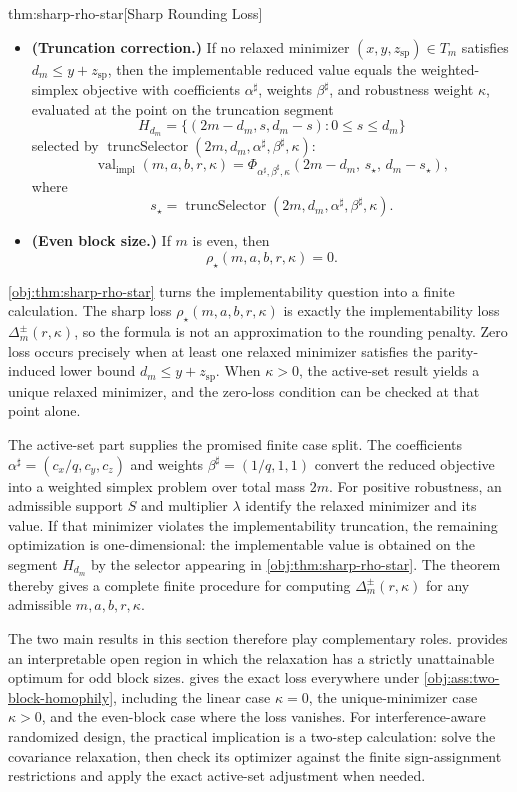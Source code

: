 \begin{theoremv}{thm:sharp-rho-star}[Sharp Rounding Loss]
\begin{itemize}
\item \textbf{(Truncation correction.)}
If no relaxed minimizer $(x,y,z_{\mathrm{sp}})\in T_m$ satisfies $d_m\le y+z_{\mathrm{sp}}$, then the implementable reduced value equals the weighted-simplex objective with coefficients $\alpha^\sharp$, weights $\beta^\sharp$, and robustness weight $\kappa$, evaluated at the point on the truncation segment
\[
H_{d_m}=\{(2m-d_m,s,d_m-s):0\le s\le d_m\}
\]
selected by $\operatorname{truncSelector}(2m,d_m,\alpha^\sharp,\beta^\sharp,\kappa)$:
\[
\operatorname{val}_{\mathrm{impl}}(m,a,b,r,\kappa)
=
\Phi_{\alpha^\sharp,\beta^\sharp,\kappa}
\!\left(
2m-d_m,\,
s_\star,\,
d_m-s_\star
\right),
\]
where
\[
s_\star=\operatorname{truncSelector}(2m,d_m,\alpha^\sharp,\beta^\sharp,\kappa).
\]

\item \textbf{(Even block size.)}
If $m$ is even, then
\[
\rho_\star(m,a,b,r,\kappa)=0.
\]
\end{itemize}
\end{theoremv}

\cref{obj:thm:sharp-rho-star} turns the implementability question into a finite calculation. The sharp loss \ensuremath{\rho_\star(m,a,b,r,\kappa)} is exactly the implementability loss \(\Delta_m^{\pm}(r,\kappa)\), so the formula is not an approximation to the rounding penalty. Zero loss occurs precisely when at least one relaxed minimizer satisfies the parity-induced lower bound \(d_m\le y+z_{\mathrm{sp}}\). When \(\kappa>0\), the active-set result yields a unique relaxed minimizer, and the zero-loss condition can be checked at that point alone.

The active-set part supplies the promised finite case split. The coefficients \(\alpha^\sharp=(c_x/q,c_y,c_z)\) and weights \(\beta^\sharp=(1/q,1,1)\) convert the reduced objective into a weighted simplex problem over total mass \(2m\). For positive robustness, an admissible support \(S\) and multiplier \(\lambda\) identify the relaxed minimizer and its value. If that minimizer violates the implementability truncation, the remaining optimization is one-dimensional: the implementable value is obtained on the segment \(H_{d_m}\) by the selector appearing in \cref{obj:thm:sharp-rho-star}. The theorem thereby gives a complete finite procedure for computing \(\Delta_m^{\pm}(r,\kappa)\) for any admissible \(m,a,b,r,\kappa\).

The two main results in this section therefore play complementary roles.  provides an interpretable open region in which the relaxation has a strictly unattainable optimum for odd block sizes.  gives the exact loss everywhere under \cref{obj:ass:two-block-homophily}, including the linear case \(\kappa=0\), the unique-minimizer case \(\kappa>0\), and the even-block case where the loss vanishes. For interference-aware randomized design, the practical implication is a two-step calculation: solve the covariance relaxation, then check its optimizer against the finite sign-assignment restrictions and apply the exact active-set adjustment when needed.

